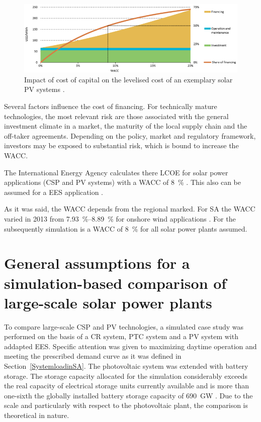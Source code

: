 \begin{figure}[htbp]  
\centering
\includegraphics[width=1\linewidth]{FIG/WACC}
\caption[Impact of cost of capital on the levelised cost of an exemplary solar PV systems.]{Impact of cost of capital on the levelised cost of an exemplary solar PV systems \cite{IEA2015}.}\label{WACC}
\end{figure}
Several factors influence the cost of financing. For technically mature technologies, the most relevant risk are those associated with the general investment climate in a market, the maturity of the local supply chain and the off-taker agreements. Depending on the policy, market and regulatory framework, investors may be exposed to substantial risk, which is bound to increase the WACC. \cite{IEA2014c} 

The International Energy Agency calculates there LCOE for solar power applications (CSP and PV systems) with a WACC of \SI{8}{\percent} \cite{IEA2014c}. This also can be assumed for a EES application \cite{Zakeri2015}.

As it was said, the WACC depends from the regional marked. For SA the WACC varied in 2013 from \SIrange{7.93}{8.89}{\percent} for onshore wind applications \cite{IEA2015}. For the subsequently simulation is a WACC of \SI{8}{\percent} for all solar power plants assumed.

\pagebreak
\section{General assumptions for a simulation-based comparison of large-scale solar power plants} \label{General assumptions}
To compare large-scale CSP and PV technologies, a simulated case study was performed on the basis of a CR system, PTC system and a PV system with addapted EES. Specific attention was given to maximizing daytime operation and meeting the prescribed demand curve as it was defined in Section~\ref{SystemloadinSA}. The photovoltaic system was extended with battery storage. The storage capacity allocated for the simulation considerably exceeds the real capacity of electrical storage units currently available and is more than one-sixth the globally installed battery storage capacity of \SI{690}{GW} \cite{IEA2015}. Due to the scale and particularly with respect to the photovoltaic plant, the comparison is theoretical in nature.

